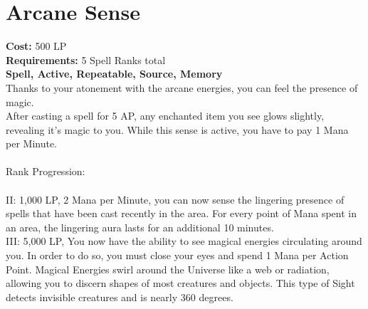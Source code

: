 \section{Arcane Sense}\label{spell:arcaneSense}
\textbf{Cost:} 500 LP\\
\textbf{Requirements:} 5 Spell Ranks total\\
\textbf{Spell, Active, Repeatable, Source, Memory}\\
Thanks to your atonement with the arcane energies, you can feel the presence of magic.\\
After casting a spell for 5 AP, any enchanted item you see glows slightly, revealing it's magic to you.
While this sense is active, you have to pay 1 Mana per Minute.\\
\\
Rank Progression:\\
\\
II: 1,000 LP, 2 Mana per Minute, you can now sense the lingering presence of spells that have been cast recently in the area.
For every point of Mana spent in an area, the lingering aura lasts for an additional 10 minutes.\\
III: 5,000 LP, You now have the ability to see magical energies circulating around you.
In order to do so, you must close your eyes and spend 1 Mana per Action Point.
Magical Energies swirl around the Universe like a web or radiation, allowing you to discern shapes of most creatures and objects.
This type of Sight detects invisible creatures and is nearly 360 degrees.\\